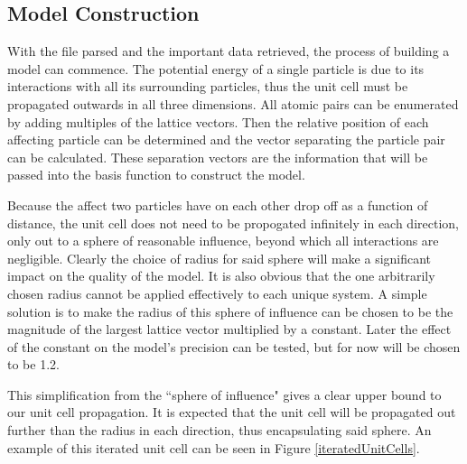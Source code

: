 \subsection{Model Construction}\label{Sect:procedureConstruction}
\par With the file parsed and the important data retrieved, the process of building a model can commence. The potential energy of a single particle is due to its interactions with all its surrounding particles, thus the unit cell must be propagated outwards in all three dimensions. All atomic pairs can be enumerated by adding multiples of the lattice vectors. Then the relative position of each affecting particle can be determined and the vector separating the particle pair can be calculated. These separation vectors are the information that will be passed into the basis function to construct the model. 
\par Because the affect two particles have on each other drop off as a function of distance, the unit cell does not need to be propogated infinitely in each direction, only out to a sphere of reasonable influence, beyond which all interactions are negligible. Clearly the choice of radius for said sphere will make a significant impact on the quality of the model. It is also obvious that the one arbitrarily chosen radius cannot be applied effectively to each unique system. A simple solution is to make the radius of this sphere of influence can be chosen to be the magnitude of the largest lattice vector multiplied by a constant. Later the effect of the constant on the model's precision can be tested, but for now will be chosen to be 1.2.
\par This simplification from the ``sphere of influence" gives a clear upper bound to our unit cell propagation. It is expected that the unit cell will be propagated out further than the radius in each direction, thus encapsulating said sphere. An example of this iterated unit cell can be seen in Figure \ref{iteratedUnitCells}. 


